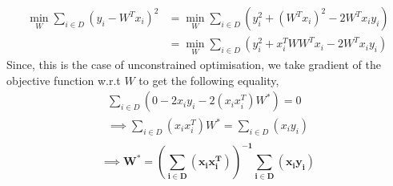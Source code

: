 \documentclass[11pt]{article}
\begin{document}
\begin{equation*}
    \begin{aligned}
    \min_W \sum_{i \in D} (y_i - W^T x_i)^2 & = \min_W \sum_{i \in D} (y_i^2 + (W^T x_i)^2 - 2 W^T x_i y_i)\\
    &= \min_W \sum_{i \in D} (y_i^2 + x_i^TWW^Tx_i - 2 W^T x_i y_i)
    \end{aligned}
\end{equation*}
Since, this is the case of unconstrained optimisation, we take gradient of the objective function w.r.t $W$ to get the following equality,
\begin{equation*}
    \begin{aligned}
        \sum_{i \in D} ( 0 - 2x_iy_i - 2(x_ix_i^T)W^*) = 0 \\
        \implies \sum_{i \in D} (x_i x_i^T) W^* = \sum_{i \in D} (x_i y_i)\\
    \end{aligned}
\end{equation*}
\begin{equation}
        \mathbf{ \implies  W^* = (\sum_{i \in D} (x_i x_i^T))^{-1} \sum_{i \in D} (x_i y_i)}   
\end{equation}




\end{document}
